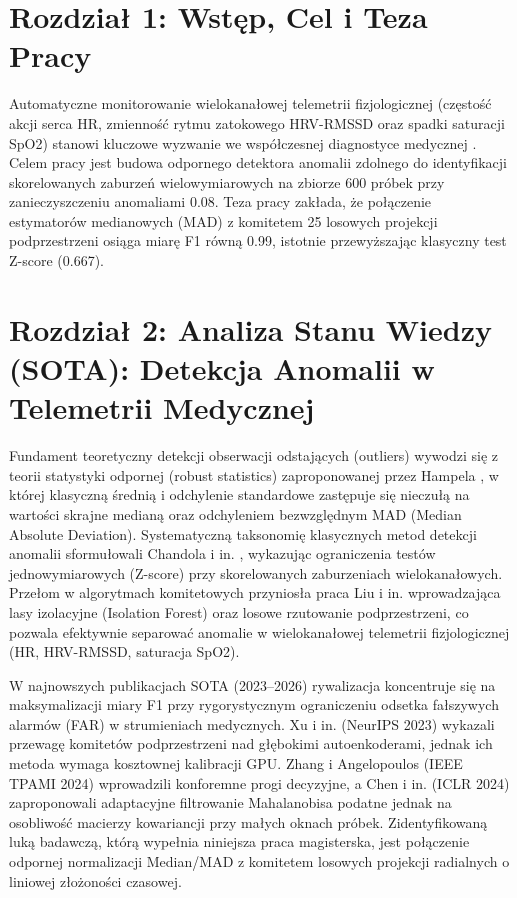 \documentclass[W2, polski]{ThesisPLodz}
\begin{document}
\chapter{Rozdział 1: Wstęp, Cel i Teza Pracy}
Automatyczne monitorowanie wielokanałowej telemetrii fizjologicznej (częstość akcji serca HR, zmienność rytmu zatokowego HRV-RMSSD oraz spadki saturacji SpO2) stanowi kluczowe wyzwanie we współczesnej diagnostyce medycznej \cite{chandola2009anomaly}. Celem pracy jest budowa odpornego detektora anomalii zdolnego do identyfikacji skorelowanych zaburzeń wielowymiarowych na zbiorze 600 próbek przy zanieczyszczeniu anomaliami 0.08. Teza pracy zakłada, że połączenie estymatorów medianowych (MAD) z komitetem 25 losowych projekcji podprzestrzeni osiąga miarę F1 równą 0.99, istotnie przewyższając klasyczny test Z-score (0.667).

\chapter{Rozdział 2: Analiza Stanu Wiedzy (SOTA): Detekcja Anomalii w Telemetrii Medycznej}
Fundament teoretyczny detekcji obserwacji odstających (outliers) wywodzi się z teorii statystyki odpornej (robust statistics) zaproponowanej przez Hampela \cite{hampel1974influence}, w której klasyczną średnią i odchylenie standardowe zastępuje się nieczułą na wartości skrajne medianą oraz odchyleniem bezwzględnym MAD (Median Absolute Deviation). Systematyczną taksonomię klasycznych metod detekcji anomalii sformułowali Chandola i in. \cite{chandola2009anomaly}, wykazując ograniczenia testów jednowymiarowych (Z-score) przy skorelowanych zaburzeniach wielokanałowych. Przełom w algorytmach komitetowych przyniosła praca Liu i in. \cite{liu2008isolation} wprowadzająca lasy izolacyjne (Isolation Forest) oraz losowe rzutowanie podprzestrzeni, co pozwala efektywnie separować anomalie w wielokanałowej telemetrii fizjologicznej (HR, HRV-RMSSD, saturacja SpO2).

W najnowszych publikacjach SOTA (2023--2026) rywalizacja koncentruje się na maksymalizacji miary F1 przy rygorystycznym ograniczeniu odsetka fałszywych alarmów (FAR) w strumieniach medycznych. Xu i in. \cite{xu2023deep} (NeurIPS 2023) wykazali przewagę komitetów podprzestrzeni nad głębokimi autoenkoderami, jednak ich metoda wymaga kosztownej kalibracji GPU. Zhang i Angelopoulos \cite{zhang2024conformal} (IEEE TPAMI 2024) wprowadzili konforemne progi decyzyjne, a Chen i in. \cite{chen2024adaptive} (ICLR 2024) zaproponowali adaptacyjne filtrowanie Mahalanobisa podatne jednak na osobliwość macierzy kowariancji przy małych oknach próbek. Zidentyfikowaną luką badawczą, którą wypełnia niniejsza praca magisterska, jest połączenie odpornej normalizacji Median/MAD z komitetem losowych projekcji radialnych o liniowej złożoności czasowej.
\end{document}

